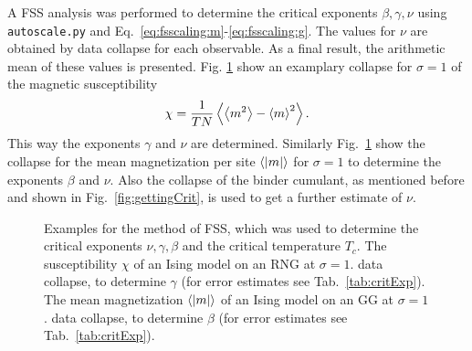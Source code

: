     A FSS analysis was
    performed to determine the critical exponents \(\beta, \gamma, \nu\)
    using \texttt{autoscale.py} \cite{autoscale2009} and Eq.\ \eqref{eq:fsscaling:m}-\eqref{eq:fsscaling:g}.
    The values for \(\nu\) are obtained by data collapse for each observable.
    As a final result, the arithmetic mean of these values is presented.
    Fig. \ref{fig:gettingCrit2}
    show an examplary collapse for \(\sigma=1\) of the magnetic susceptibility
    \begin{equation}
        \chi = \frac{1}{TN}\left< \left< m^2 \right> - \left< m \right>^2 \right>.
    \end{equation}
    This way the exponents \(\gamma\) and \(\nu\) are determined.
    Similarly Fig.\ \ref{fig:gettingCrit2}
    show the collapse for the mean magnetization per site \(\left< \left\vert m\right\vert \right>\) for \(\sigma=1\)
    to determine the exponents \(\beta\) and \(\nu\).
    Also the collapse of the binder cumulant, as mentioned before and shown
    in Fig.\ \ref{fig:gettingCrit},
    is used to get a further estimate of \(\nu\).
    \begin{figure}[htbp]
        \centering
        \caption[Examples of Determining Critical Temperature and Exponents]
        {
            Examples for the method of FSS, which was used
            to determine the critical exponents \(\nu, \gamma, \beta\) and
            the critical temperature \(T_c\).
             The susceptibility \(\chi\)
                of an Ising model on an RNG at \(\sigma=1\).
             data collapse, to determine \(\gamma\) (for error estimates see Tab.\ \ref{tab:critExp}).
             The mean magnetization \(\left< \left\vert m\right\vert \right>\)
                of an Ising model on an GG at \(\sigma=1\).
             data collapse, to determine \(\beta\) (for error estimates see Tab.\ \ref{tab:critExp}).
        }
        \label{fig:gettingCrit2}
    \end{figure}\\
